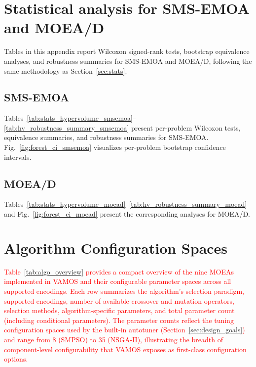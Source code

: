 \documentclass[journal]{IEEEtran}
\newcommand{\VAMOS}{VAMOS}
\begin{document}
\section{Statistical analysis for SMS-EMOA and MOEA/D}
\label{app:stats}

Tables in this appendix report Wilcoxon signed-rank tests, bootstrap equivalence analyses, and robustness summaries for SMS-EMOA and MOEA/D, following the same methodology as Section~\ref{sec:stats}.

\subsection{SMS-EMOA}

Tables~\ref{tab:stats_hypervolume_smsemoa}--\ref{tab:hv_robustness_summary_smsemoa} present per-problem Wilcoxon tests, equivalence summaries, and robustness summaries for SMS-EMOA. Fig.~\ref{fig:forest_ci_smsemoa} visualizes per-problem bootstrap confidence intervals.

\begingroup
\setlength{\tabcolsep}{2pt}

\endgroup

\subsection{MOEA/D}

Tables~\ref{tab:stats_hypervolume_moead}--\ref{tab:hv_robustness_summary_moead} and Fig.~\ref{fig:forest_ci_moead} present the corresponding analyses for MOEA/D.

\begingroup
\setlength{\tabcolsep}{2pt}

\endgroup

\section{Algorithm Configuration Spaces}
\label{app:param_space}

\textcolor{red}{Table~\ref{tab:algo_overview} provides a compact overview of the nine MOEAs implemented in \VAMOS{} and their configurable parameter spaces across all supported encodings. Each row summarizes the algorithm's selection paradigm, supported encodings, number of available crossover and mutation operators, selection methods, algorithm-specific parameters, and total parameter count (including conditional parameters). The parameter counts reflect the tuning configuration spaces used by the built-in autotuner (Section~\ref{sec:design_goals}) and range from 8 (SMPSO) to 35 (NSGA-II), illustrating the breadth of component-level configurability that \VAMOS{} exposes as first-class configuration options.}
\end{document}
